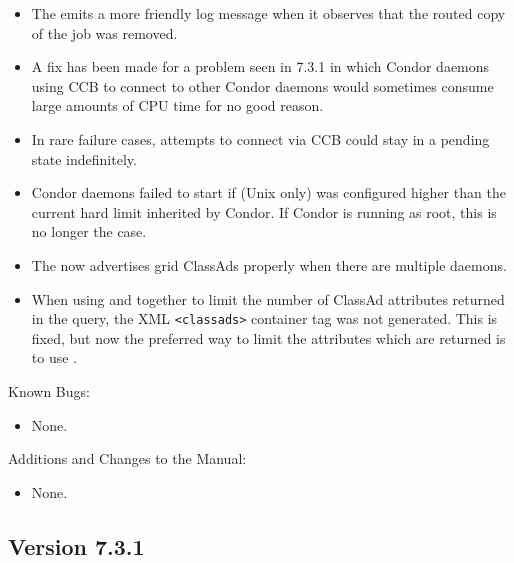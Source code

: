 \begin{itemize}
\item The  emits a more friendly log message when it
observes that the routed copy of the job was removed.

\item A fix has been made for a problem seen in 7.3.1 in which Condor daemons
using CCB to connect to other Condor daemons would sometimes consume
large amounts of CPU time for no good reason.

\item In rare failure cases, attempts to connect via CCB could stay in
a pending state indefinitely.

\item Condor daemons failed to start if
 (Unix only) was configured higher
than the current hard limit inherited by Condor.  If Condor is running
as root, this is no longer the case.

\item The  now advertises grid ClassAds properly when there
are multiple  daemons.

\item When using   and  together to
limit the number of ClassAd attributes returned in the query, the XML
\verb|<classads>| container tag was not generated.  This is fixed, but
now the preferred way to limit the attributes which are returned is to
use  .

\end{itemize}

\noindent Known Bugs:

\begin{itemize}

\item None.

\end{itemize}

\noindent Additions and Changes to the Manual:

\begin{itemize}

\item None.

\end{itemize}


\subsection*{\label{sec:New-7-3-1}Version 7.3.1}

